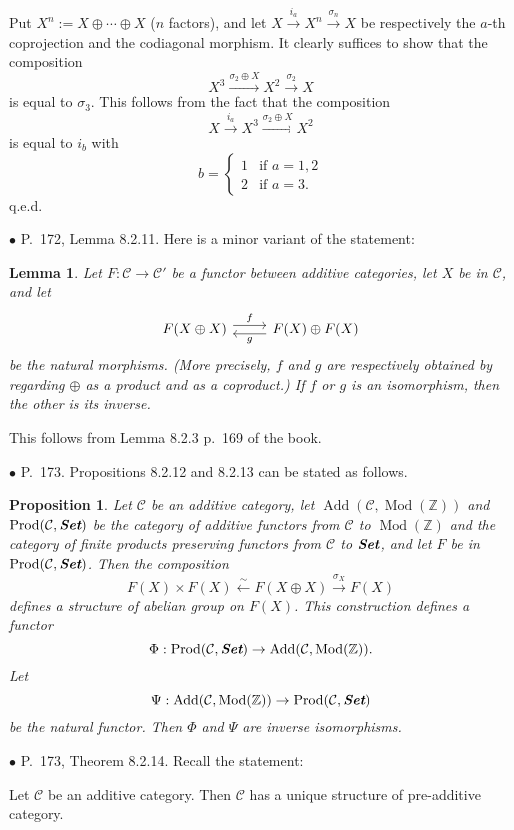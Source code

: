 \documentclass[12pt]{article}
\newtheorem{lem}[thm]{Lemma}
\newtheorem{prop}[thm]{Proposition}
\theoremstyle{remark}%
\newcommand{\bu}{\bullet}
\newcommand{\n}{\noindent}
\newcommand{\C}{\mathcal C}
\newcommand{\xr}{\xrightarrow}
\newcommand{\pr}{Proposition}
\DeclareMathOperator{\Mod}{Mod}
\begin{document}
Put $X^n:=X\oplus\cdots\oplus X$ ($n$ factors), and let $X\xr{i_a}X^n\xr{\sigma_n}X$ be respectively the $a$-th coprojection and the codiagonal morphism. It clearly suffices to show that the composition 
$$
X^3\xr{\sigma_2\oplus X}X^2\xr{\sigma_2}X
$$ 
is equal to $\sigma_3$. This follows from the fact that the composition 
$$
X\xr{i_a}X^3\xr{\sigma_2\oplus X}X^2
$$ 
is equal to $i_b$ with 
$$
b=\begin{cases}1&\text{if }a=1,2\\2&\text{if }a=3.\end{cases}
$$ 
q.e.d. 


\n$\bu$ P.~172, Lemma 8.2.11. Here is a minor variant of the statement: 
%
\begin{lem}
Let $F:\C\to\C'$ be a functor between additive categories, let $X$ be in $\C$, and let 
$$
\begin{tikzcd}
F(X\oplus X)\ar[yshift=.7ex]{r}{f}&F(X)\oplus F(X)\ar[yshift=-.7ex]{l}{g}
\end{tikzcd}
$$ 
be the natural morphisms. (More precisely, $f$ and $g$ are respectively obtained by regarding $\oplus$ as a product and as a coproduct.) If $f$ or $g$ is an isomorphism, then the other is its inverse. 
\end{lem}
% 
This follows from Lemma 8.2.3 p.~169 of the book.\bigskip 


\n$\bu$ P.~173. \pr s 8.2.12 and 8.2.13 can be stated as follows. 
%
\begin{prop}\label{8212}
%
Let $\C$ be an additive category, let $\operatorname{Add}(\C,\Mod(\mathbb Z))$ and $\operatorname{Prod}(\C,\textbf{\em Set})$ be the category of additive functors from $\C$ to $\Mod(\mathbb Z)$ and the category of finite products preserving functors from $\C$ to $\textbf{\em Set}$, and let $F$ be in $\operatorname{Prod}(\C,\textbf{\em Set})$. Then the composition 
$$
F(X)\times F(X)\xleftarrow\sim F(X\oplus X)\xr{\sigma_X}F(X)
$$ 
defines a structure of abelian group on $F(X)$. This construction defines a functor 
$$
\Phi:\operatorname{Prod}(\C,\textbf{\em Set})\to\operatorname{Add}(\C,\Mod(\mathbb Z)).
$$ 
Let 
$$
\Psi:\operatorname{Add}(\C,\Mod(\mathbb Z))\to\operatorname{Prod}(\C,\textbf{\em Set})
$$ 
be the natural functor. Then $\Phi$ and $\Psi$ are inverse isomorphisms. 
%
\end{prop}

\n$\bu$ P.~173, Theorem 8.2.14. Recall the statement: 

Let $\C$ be an additive category. Then $\C$ has a unique structure of pre-additive category. 
\end{document}
